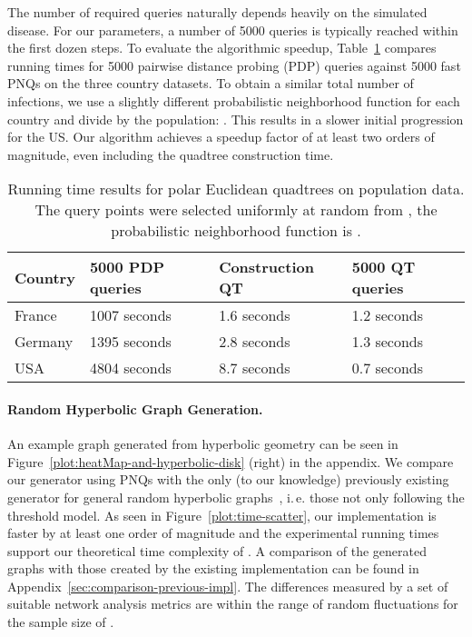 \documentclass{llncs}
\newcommand{\ie}{i.\,e.\xspace}
\begin{document}
The number of required queries naturally depends heavily on the simulated disease.
For our parameters, a number of 5000 queries is typically reached within the first dozen steps.
To evaluate the algorithmic speedup, Table~\ref{table:running-time-queries-country} compares running times for 5000 pairwise
distance probing (PDP) queries against 5000 fast PNQs on the three country datasets.
To obtain a similar total number of infections, we use a slightly different probabilistic neighborhood function for each country and divide by the population: .
This results in a slower initial progression for the US.
Our algorithm achieves a speedup factor of at least two orders of magnitude, even including the quadtree construction time.

\begin{table}[bt]
\centering 
\begin{tabular}{l|l|l|l}
 Country & 5000 PDP queries & Construction QT & 5000 QT queries\\
 \hline
 France & 1007 seconds & 1.6 seconds & 1.2 seconds\\ 
 Germany & 1395 seconds & 2.8 seconds & 1.3 seconds\\
 USA & 4804 seconds & 8.7 seconds & 0.7 seconds
\end{tabular}
\smallskip 
\caption{Running time results for polar Euclidean quadtrees on population data.
The query points were selected uniformly at random from , the probabilistic neighborhood function is .
}
\label{table:running-time-queries-country}
\end{table}


\paragraph{Random Hyperbolic Graph Generation.}
An example graph generated from hyperbolic geometry can be seen in Figure~\ref{plot:heatMap-and-hyperbolic-disk} (right) in the appendix.
We compare our generator using PNQs with the only (to our knowledge) previously existing generator for general random hyperbolic graphs~\cite{Aldecoa2015}, \ie those not only following the threshold model.
As seen in Figure~\ref{plot:time-scatter}, our implementation is faster by at least one order of magnitude and the experimental running times support our theoretical time complexity of .
A comparison of the generated graphs with those created by the existing implementation can be found in Appendix~\ref{sec:comparison-previous-impl}. The differences measured by a set of suitable network analysis metrics are within the
range of random fluctuations for the sample size of .
\end{document}
